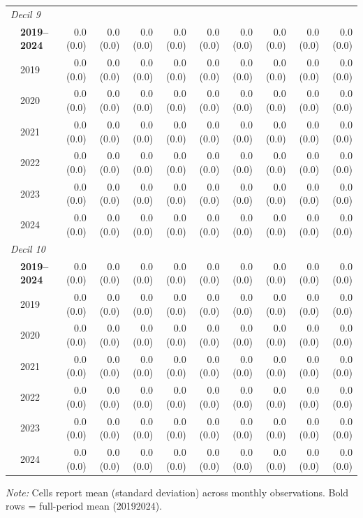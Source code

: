 \begin{table}[htbp]
\begin{tabular}{llrrrrrrrrr}
\multicolumn{11}{l}{\textit{Decil 9}} \\
 & \textbf{2019–2024} & 0.0 (0.0) & 0.0 (0.0) & 0.0 (0.0) & 0.0 (0.0) & 0.0 (0.0) & 0.0 (0.0) & 0.0 (0.0) & 0.0 (0.0) & 0.0 (0.0) \\
 & 2019 & 0.0 (0.0) & 0.0 (0.0) & 0.0 (0.0) & 0.0 (0.0) & 0.0 (0.0) & 0.0 (0.0) & 0.0 (0.0) & 0.0 (0.0) & 0.0 (0.0) \\
 & 2020 & 0.0 (0.0) & 0.0 (0.0) & 0.0 (0.0) & 0.0 (0.0) & 0.0 (0.0) & 0.0 (0.0) & 0.0 (0.0) & 0.0 (0.0) & 0.0 (0.0) \\
 & 2021 & 0.0 (0.0) & 0.0 (0.0) & 0.0 (0.0) & 0.0 (0.0) & 0.0 (0.0) & 0.0 (0.0) & 0.0 (0.0) & 0.0 (0.0) & 0.0 (0.0) \\
 & 2022 & 0.0 (0.0) & 0.0 (0.0) & 0.0 (0.0) & 0.0 (0.0) & 0.0 (0.0) & 0.0 (0.0) & 0.0 (0.0) & 0.0 (0.0) & 0.0 (0.0) \\
 & 2023 & 0.0 (0.0) & 0.0 (0.0) & 0.0 (0.0) & 0.0 (0.0) & 0.0 (0.0) & 0.0 (0.0) & 0.0 (0.0) & 0.0 (0.0) & 0.0 (0.0) \\
 & 2024 & 0.0 (0.0) & 0.0 (0.0) & 0.0 (0.0) & 0.0 (0.0) & 0.0 (0.0) & 0.0 (0.0) & 0.0 (0.0) & 0.0 (0.0) & 0.0 (0.0) \\
\midrule
\multicolumn{11}{l}{\textit{Decil 10}} \\
 & \textbf{2019–2024} & 0.0 (0.0) & 0.0 (0.0) & 0.0 (0.0) & 0.0 (0.0) & 0.0 (0.0) & 0.0 (0.0) & 0.0 (0.0) & 0.0 (0.0) & 0.0 (0.0) \\
 & 2019 & 0.0 (0.0) & 0.0 (0.0) & 0.0 (0.0) & 0.0 (0.0) & 0.0 (0.0) & 0.0 (0.0) & 0.0 (0.0) & 0.0 (0.0) & 0.0 (0.0) \\
 & 2020 & 0.0 (0.0) & 0.0 (0.0) & 0.0 (0.0) & 0.0 (0.0) & 0.0 (0.0) & 0.0 (0.0) & 0.0 (0.0) & 0.0 (0.0) & 0.0 (0.0) \\
 & 2021 & 0.0 (0.0) & 0.0 (0.0) & 0.0 (0.0) & 0.0 (0.0) & 0.0 (0.0) & 0.0 (0.0) & 0.0 (0.0) & 0.0 (0.0) & 0.0 (0.0) \\
 & 2022 & 0.0 (0.0) & 0.0 (0.0) & 0.0 (0.0) & 0.0 (0.0) & 0.0 (0.0) & 0.0 (0.0) & 0.0 (0.0) & 0.0 (0.0) & 0.0 (0.0) \\
 & 2023 & 0.0 (0.0) & 0.0 (0.0) & 0.0 (0.0) & 0.0 (0.0) & 0.0 (0.0) & 0.0 (0.0) & 0.0 (0.0) & 0.0 (0.0) & 0.0 (0.0) \\
 & 2024 & 0.0 (0.0) & 0.0 (0.0) & 0.0 (0.0) & 0.0 (0.0) & 0.0 (0.0) & 0.0 (0.0) & 0.0 (0.0) & 0.0 (0.0) & 0.0 (0.0) \\
\bottomrule
\end{tabular}
\begin{minipage}{\linewidth}
\vspace{2pt}\footnotesize
\textit{Note:} Cells report mean (standard deviation) across monthly observations. Bold rows = full-period mean (2019\textendash{}2024).
\end{minipage}
\end{table}
